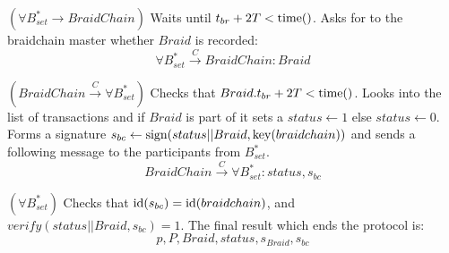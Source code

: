 \documentclass[12pt]{article}
\begin{document}
\begin{steps}

\item $(\forall B^*_{set} \to BraidChain)$ Waits until $t_{br} + 2T < {\rm time}()$. Asks for to the braidchain master whether $Braid$ is recorded:
  \begin{equation}
    \forall B^*_{set} \overset{C}{\to} BraidChain: Braid
  \end{equation}
  

\item $(BraidChain \overset{C}{\to} \forall B^*_{set})$ Checks that $Braid.t_{br} + 2T < {\rm time}()$. Looks into the list of transactions and if $Braid$ is part of it sets a $status \leftarrow 1$ else $status \leftarrow 0$. Forms a signature $s_{bc} \leftarrow {\rm sign}(status||Braid,{\rm key}(braidchain))$ and sends a following message to the participants from $B^*_{set}$.
  \begin{equation}
    BraidChain \overset{C}{\to} \forall B^*_{set}: status, s_{bc}
  \end{equation}
  
\item $(\forall B^*_{set})$ Checks that ${\rm id}(s_{bc}) = {\rm id}(braidchain)$, and $verify(status||Braid, s_{bc})=1$. The final result which ends the protocol is:
\begin{equation}
 p, P, Braid, status, s_{Braid}, s_{bc}
\end{equation}

\end{steps}
\end{document}
